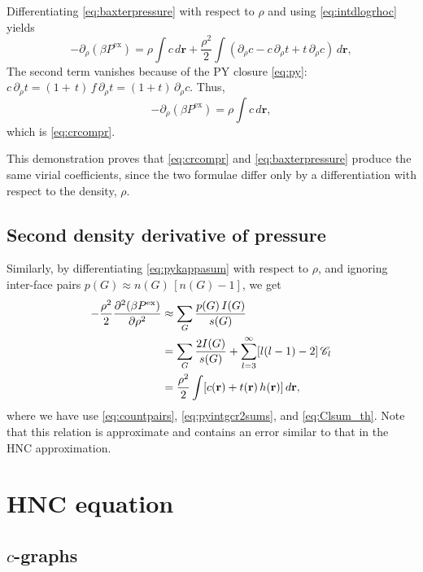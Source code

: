 \documentclass[preprint]{revtex4-1}
\newcommand{\vct}[1]{\mathbf{#1}}
\providecommand{\vr}{} %
\renewcommand{\vr}{\vct{r}}
\newcommand{\supex}[1]{ { { #1 }^{ \mathrm{ex} } } }
\newcommand{\Pex}{\supex{P}}
\newcommand{\Chn}{\mathscr{C}}
\begin{document}
Differentiating \eqref{eq:baxterpressure}
with respect to $\rho$ and using \eqref{eq:intdlogrhoc} yields
%
\[
  -\partial_\rho ( \beta \Pex )
=
  \rho \int c \, d\vr
  + \frac{\rho^2}{2} \int (
    \partial_\rho c - c \, \partial_\rho t + t \, \partial_\rho c
    ) \, d\vr,
\]
The second term vanishes because of the PY closure \eqref{eq:py}:
$c \, \partial_\rho t = (1 + \, t) \, f \, \partial_\rho t = (1 + t) \, \partial_\rho c$.
%
Thus,
\[
  -\partial_\rho ( \beta \Pex )
=
  \rho \int c \, d\vr,
\]
which is \eqref{eq:crcompr}.

This demonstration proves that
\eqref{eq:crcompr} and \eqref{eq:baxterpressure}
produce the same virial coefficients,
since the two formulae differ only
by a differentiation with respect to the density, $\rho$.




\subsection{Second density derivative of pressure}

Similarly,
  by differentiating \eqref{eq:pykappasum} with respect to $\rho$,
  and ignoring inter-face pairs $p(G) \approx n(G) \, [n(G) - 1]$,
  we get
%
\begin{align}
           -\frac{\rho^2}{2}
            \frac{\partial^2 ( \beta \Pex ) }
                 {\partial \rho^2}
  &\approx   \sum_G \frac{ p(G) \, I(G) }{ s(G) }
    \notag \\
  &=
            \sum_G \frac{2 I(G) }{s(G)}
            + \sum_{l = 3}^\infty [l(l-1) - 2] \, \Chn_l
    \notag \\
  &=         \frac{\rho^2}{2} \int [c(\vr) + t(\vr) \, h(\vr) ] \, d\vr,
\label{eq:pyddpressure}
\end{align}
%
where we have use \eqref{eq:countpairs}, \eqref{eq:pyintgcr2sums}, and \eqref{eq:Clsum_th}.
%
Note that this relation is approximate
  and contains an error
  similar to that in the HNC approximation.





\section{\label{sec:hnc}HNC equation}


\subsection{$c$-graphs}
\end{document}
